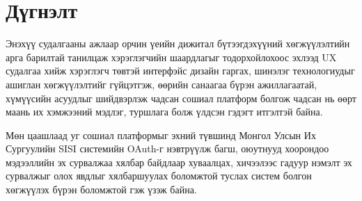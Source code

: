 \chapter{Дүгнэлт}

Энэхүү судалгааны ажлаар орчин үеийн дижитал бүтээгдэхүүний хөгжүүлэлтийн арга барилтай танилцаж хэрэглэгчийн шаардлагыг тодорхойлохоос эхлээд UX судалгаа хийж хэрэглэгч төвтэй интерфэйс дизайн гаргах, шинэлэг технологиудыг ашиглан хөгжүүлэлтийг гүйцэтгэж, өөрийн санаагаа бүрэн ажиллагаатай, хүмүүсийн асуудлыг шийдвэрлэж чадсан сошиал платформ болгож чадсан нь өөрт маань их хэмжээний мэдлэг, туршлага болж үлдсэн гэдэгт итгэлтэй байна.

Мөн цаашлаад уг сошиал платформыг эхний түвшинд Монгол Улсын Их Сургуулийн SISI системийн OAuth-г нэвтрүүлж багш, оюутнууд хоорондоо мэдээллийн эх сурвалжаа хялбар байдлаар хуваалцах, хичээлээс гадуур нэмэлт эх сурвалжыг олох явдлыг хялбаршуулах боломжтой туслах систем болгон хөгжүүлэх бүрэн боломжтой гэж үзэж байна.